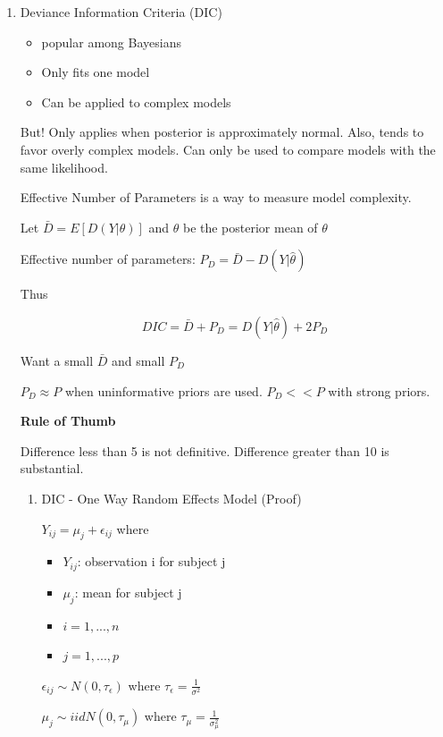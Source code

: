 \documentclass[11pt]{article}
\begin{document}
\begin{enumerate}
\item Deviance Information Criteria (DIC)
\label{sec:org6345aa5}

\begin{itemize}
\item popular among Bayesians
\item Only fits one model
\item Can be applied to complex models
\end{itemize}

But! Only applies when posterior is approximately normal. Also, tends to favor
overly complex models. Can only be used to compare models with the same likelihood.

Effective Number of Parameters is a way to measure model complexity.


Let \(\bar D = E[ D(Y | \theta)]\) and \(\hat \theta\) be the posterior mean of
\(\theta\)

Effective number of parameters: \(P_D = \bar D - D(Y | \hat \theta)\)

Thus

$$
DIC = \bar D + P_D = D(Y | \hat \theta) + 2 P_D
$$


Want a small \(\bar D\) and small \(P_D\)


\(P_D \approx P\) when uninformative priors are used. \(P_D << P\) with strong priors.


\textbf{Rule of Thumb}

Difference less than 5 is not definitive.
Difference greater than 10 is substantial.

\begin{enumerate}
\item DIC - One Way Random Effects Model (Proof)
\label{sec:org010b8ad}

\(Y_{ij} = \mu_j + \epsilon_{ij}\) where

\begin{itemize}
\item \(Y_{ij}\): observation i for subject j
\item \(\mu_j\): mean for subject j
\item \(i = 1, ..., n\)
\item \(j = 1, ..., p\)
\end{itemize}

\(\epsilon_{ij} \sim N(0, \tau_{\epsilon})\) where \(\tau_{\epsilon} =
\frac{1}{\sigma^2}\)

\(\mu_j \sim iid N(0, \tau_\mu)\) where \(\tau_\mu = \frac{1}{\sigma_\mu^2}\)


\end{enumerate}
\end{enumerate}
\end{document}
